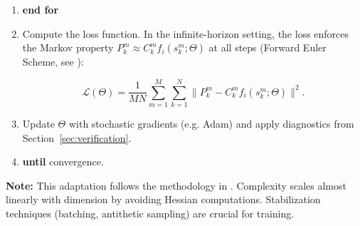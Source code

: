 ﻿\documentclass[11pt,letterpaper,oneside]{article}
\numberwithin{equation}{section}
\newcommand{\1}{\mathbf{1}}
\begin{document}
\begin{tcolorbox}[float, title={Algorithm 1: Deep BSDE Training Loop (Infinite-Horizon Adaptation)}, label={alg:deepbsde}]
\begin{enumerate}[leftmargin=1.5em,itemsep=0.5em]
  \item \quad \textbf{end for}

    \item \quad Compute the loss function. In the infinite-horizon setting, the loss enforces the Markov property $P_k^m \approx C_k^m f_i(s_k^m;\Theta)$ at all steps (Forward Euler Scheme, see \cite{huang2025probabilistic}):

  \begin{equation*}
    \mathcal{L}(\Theta) = \frac{1}{MN}\sum_{m=1}^M\sum_{k=1}^N \big\lVert P_k^m - C_k^m f_i(s_k^m;\Theta) \big\rVert^2.
  \end{equation*}

    \item \quad Update $\Theta$ with stochastic gradients (e.g. Adam) and apply diagnostics from Section~\ref{sec:verification}.

  \item \textbf{until} convergence.

\end{enumerate}

\textbf{Note:} This adaptation follows the methodology in \cite{han2018solving,huang2025probabilistic}. Complexity scales almost linearly with dimension by avoiding Hessian computations. Stabilization techniques (batching, antithetic sampling) are crucial for training.

\end{tcolorbox}
\end{document}
